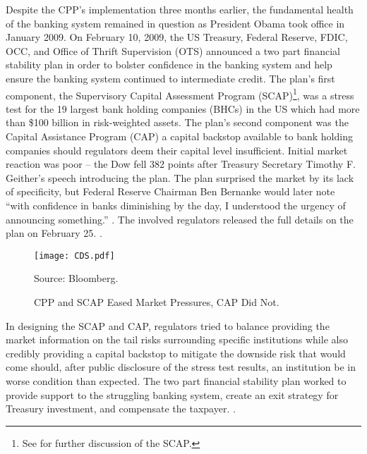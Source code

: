 \documentclass[12pt]{article}
\begin{document}
Despite the CPP's implementation three months earlier, the fundamental health of the banking system remained in question as President Obama took office in January 2009. On February 10, 2009, the US Treasury, Federal Reserve, FDIC, OCC, and Office of Thrift Supervision (OTS) announced a two part financial stability plan in order to bolster confidence in the banking system and help ensure the banking system continued to intermediate credit. The plan’s first component, the Supervisory Capital Assessment Program (SCAP)\footnote{See \citet{Ross2016b} for further discussion of the SCAP.}, was a stress test for the 19 largest bank holding companies (BHCs) in the US which had more than \$100 billion in risk-weighted assets. The plan’s second component was the Capital Assistance Program (CAP) a capital backstop available to bank holding companies should regulators deem their capital level insufficient. Initial market reaction was poor -- the Dow fell 382 points after Treasury Secretary Timothy F. Geither’s speech introducing the plan. The plan surprised the market by its lack of specificity, but Federal Reserve Chairman Ben Bernanke would later note “with confidence in banks diminishing by the day, I understood the urgency of announcing something.'' \citep{Bernanke}. The involved regulators released the full details on the plan on February 25. \citep{CAPTerms}.

\begin{figure}[h]
\caption{CPP and SCAP Eased Market Pressures, CAP Did Not.}\label{figure1}
\centering
\texttt{[image: CDS.pdf]}
\raggedright
\footnotesize Source: Bloomberg.
\end{figure}


In designing the SCAP and CAP, regulators tried to balance providing the market information on the tail risks surrounding specific institutions while also credibly providing a capital backstop to mitigate the downside risk that would come should, after public disclosure of the stress test results, an institution be in worse condition than expected. The two part financial stability plan worked to provide support to the struggling banking system, create an exit strategy for Treasury investment, and compensate the taxpayer. \citep{GW}.
\end{document}
